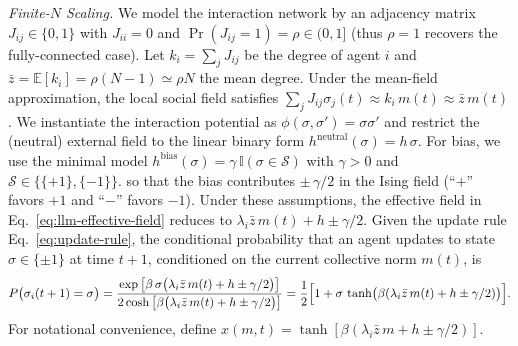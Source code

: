 \documentclass{article}
\theoremstyle{plain}
\theoremstyle{definition}
\theoremstyle{remark}
\begin{document}
\textsl{Finite-$N$ Scaling. }
We model the interaction network by an adjacency matrix
$J_{ij}\in\{0,1\}$ with $J_{ii}=0$ and $\Pr(J_{ij}=1)=\rho\in(0,1]$ (thus $\rho=1$ recovers the fully-connected case).
Let $k_i=\sum_{j}J_{ij}$ be the degree of agent $i$ and $\bar{z}=\mathbb{E}[k_i]=\rho(N-1)\simeq \rho N$ the mean degree.
Under the mean-field approximation, the local social field satisfies
$\sum_{j}J_{ij}\sigma_j(t)\approx k_i\,m(t)\approx \bar{z}\,m(t)$.
We instantiate the interaction potential as $\phi(\sigma,\sigma')=\sigma\sigma'$ and restrict the (neutral) external field to the linear binary form
$h^{\mathrm{neutral}}(\sigma)=h\,\sigma$.
For bias, we use the minimal model $h^{\mathrm{bias}}(\sigma)=\gamma\,\mathbb{I}(\sigma\in\mathcal{S})$ with $\gamma>0$ and
$\mathcal{S}\in\{\{+1\},\{-1\}\}$. %
so that the bias contributes $\pm\,\gamma/2$ in the Ising field (``$+$'' favors $+1$ and ``$-$'' favors $-1$).
Under these assumptions, the effective field in Eq.~\eqref{eq:llm-effective-field} reduces to
$\lambda_i \bar{z}\, m(t) + h \pm \gamma/2$. 
Given the update rule Eq.~\eqref{eq:update-rule}, the conditional probability that an agent updates to state $\sigma\in\{\pm1\}$ at time $t+1$,
conditioned on the current collective norm $m(t)$, is
\begin{align}
P\bigl(\sigma_i(t+1)=\sigma\bigr)
=\frac{\exp\left[\beta\,\sigma\bigl(\lambda_i \bar{z}\,m(t)+h\pm\gamma/2\bigr)\right]}
{2\cosh\left[\beta\bigl(\lambda_i \bar{z}\,m(t)+h\pm\gamma/2\bigr)\right]}
=\frac{1}{2}\Bigl[1+\sigma\,\tanh\bigl(\beta(\lambda_i \bar{z}\,m(t)+h\pm\gamma/2)\bigr)\Bigr].
\end{align}
For notational convenience, define $x(m,t)=\tanh[\beta(\lambda_i \bar{z}\,m+h\pm\gamma/2)]$.
\end{document}
